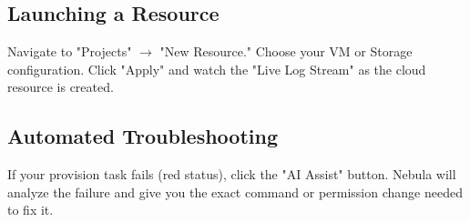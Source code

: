 \subsection{Launching a Resource}
Navigate to "Projects" $\rightarrow$ "New Resource." Choose your VM or Storage configuration. Click "Apply" and watch the "Live Log Stream" as the cloud resource is created.

\subsection{Automated Troubleshooting}
If your provision task fails (red status), click the "AI Assist" button. Nebula will analyze the failure and give you the exact command or permission change needed to fix it.

\newpage

